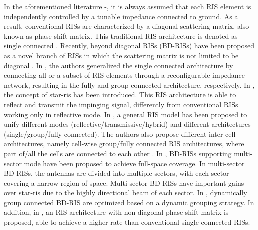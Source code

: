 \documentclass[twocolumn,10pt]{IEEEtran}
\begin{document}
In the aforementioned literature \cite{bad19}-\cite{dun20}, it is always assumed that each RIS element is independently controlled by a tunable impedance connected to ground.
As a result, conventional RISs are characterized by a diagonal scattering matrix, also known as phase shift matrix.
This traditional RIS architecture is denoted as single connected \cite{she20}.
Recently, beyond diagonal RISs (BD-RISs) have been proposed as a novel branch of RISs in which the scattering matrix is not limited to be diagonal \cite{she20}.
In \cite{she20}, the authors generalized the single connected architecture by connecting all or a subset of RIS elements through a reconfigurable impedance network, resulting in the fully and group-connected architecture, respectively.
In \cite{xu21b}, the concept of \gls{star-ris} has been introduced.
This RIS architecture is able to reflect and transmit the impinging signal, differently from conventional RISs working only in reflective mode.
In \cite{li22-1}, a general RIS model has been proposed to unify different modes (reflective/transmissive/hybrid) and different architectures (single/group/fully connected).
The authors also propose different inter-cell architectures, namely cell-wise group/fully connected RIS architectures, where part of/all the cells are connected to each other \cite{li22-1}.
In \cite{li22-2}, BD-RISs supporting multi-sector mode have been proposed to achieve full-space coverage.
In multi-sector BD-RISs, the antennas are divided into multiple sectors, with each sector covering a narrow region of space.
Multi-sector BD-RISs have important gains over \gls{star-ris} due to the highly directional beam of each sector.
In \cite{li22-3}, dynamically group connected BD-RIS are optimized based on a dynamic grouping strategy.
In addition, in \cite{li22}, an RIS architecture with non-diagonal phase shift matrix is proposed, able to achieve a higher rate than conventional single connected RISs.
\end{document}
